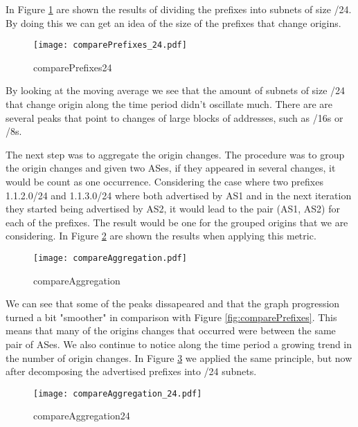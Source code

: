 \documentclass[11pt,a4paper]{scrreprt}
\begin{document}
In Figure \ref{fig:comparePrefixes_24} are shown the results of dividing the prefixes into subnets of size /24. By doing this we can get an idea of the size of the prefixes that change origins.  

\begin{figure}[ht!]
\centering
\texttt{[image: comparePrefixes\_24.pdf]}
\caption{comparePrefixes24}
\label{fig:comparePrefixes_24}
\end{figure}

By looking at the moving average we see that the amount of subnets of size /24 that change origin along the time period didn't oscillate much. There are are several peaks that point to changes of large blocks of addresses, such as /16s or /8s.

The next step was to aggregate the origin changes. The procedure was to group the origin changes and given two ASes, if they appeared in several changes, it would be count as one occurrence. Considering the case where two prefixes 1.1.2.0/24 and 1.1.3.0/24 where both advertised by AS1 and in the next iteration they started being advertised by AS2, it would lead to the pair (AS1, AS2) for each of the prefixes. The result would be one for the grouped origins that we are considering. In Figure \ref{fig:compareAggregation} are shown the results when applying this metric.       

\begin{figure}[ht!]
\centering
\texttt{[image: compareAggregation.pdf]}
\caption{compareAggregation}
\label{fig:compareAggregation}
\end{figure}

We can see that some of the peaks dissapeared and that the graph progression turned a bit "smoother" in comparison with Figure \ref{fig:comparePrefixes}. This means that many of the origins changes that occurred were between the same pair of ASes. We also continue to notice along the time period a growing trend in the number of origin changes.
In Figure \ref{fig:compareAggregation24} we applied the same principle, but now after decomposing the advertised prefixes into /24 subnets. 


\begin{figure}[ht!]
\centering
\texttt{[image: compareAggregation\_24.pdf]}
\caption{compareAggregation24}
\label{fig:compareAggregation24}
\end{figure}
\end{document}
